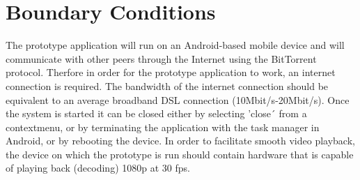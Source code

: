 \section{Boundary Conditions}
The prototype application will run on an Android-based mobile device and will communicate with other peers through the Internet using the BitTorrent protocol. Therfore in order for the prototype application to work, an internet connection is required. The bandwidth of the internet connection should be equivalent to an average broadband DSL connection (10Mbit/s-20Mbit/s). Once the system is started it can be closed either by selecting 'close´ from a contextmenu, or by terminating the application with the task manager in Android, or by rebooting the device. In order to facilitate smooth video playback, the device on which the prototype is run should contain hardware that is capable of playing back (decoding) 1080p at 30 fps. 
